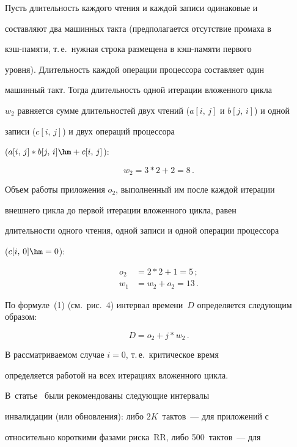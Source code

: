     Пусть длительность каждого чтения и каждой записи одинаковые и 

составляют два машинных такта (предполагается отсутствие промаха в 

кэш-памяти, т.\,е.\ нужная строка размещена в кэш-памяти первого 

уровня). Длительность каждой операции процессора составляет один 

машинный такт. Тогда длительность одной итерации вложенного цикла 

$w_2$ равняется сумме длительностей двух чтений ($a[i,\,j]$ и $b[j,\,i]$) и одной 

записи ($c[i,\,j]$) и  двух операций процессора 

($a[i,\,j]*b[j,\,i] \hm+ c[i,\,j]$):

    $$

     w_2=3*2 + 2 = 8\,.

    $$

    

    Объем работы приложения $o_2$, выполненный им после каждой итерации 

внешнего цикла до первой итерации вложенного цикла,  равен 

длительности одного чтения, одной записи и одной операции процессора 

($c[i,\,0]\hm= 0$):

    \begin{align*}

    o_2&=2*2 + 1 =5\,;\\

    w_1&= w_2+ o_2= 13\,.

    \end{align*}

    

    По формуле~(1) (см.\ рис.~4) интервал времени~$D$ определяется следующим образом:

    $$

     D = o_2+ j*w_2\,.

    $$

    

    В рассматриваемом случае $i = 0$, т.\,е.\ критическое время 

определяется работой на всех итерациях вложенного цикла. 

В~статье~\cite{2ss} были рекомендованы следующие интервалы 

инвалидации (или обновления): либо $2K$~тактов~--- для приложений с 

относительно короткими фазами риска~RR, либо 500~тактов~--- для 

